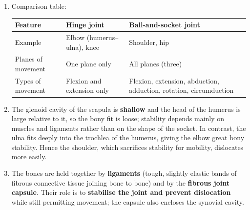 \documentclass[11pt]{article}
\begin{document}
\begin{corrige}
\begin{enumerate}
\item Comparison table:
\begin{center}
\begin{tabularx}{\linewidth}{|l|X|X|}
\hline
\rowcolor{popblueL} Feature & Hinge joint & Ball-and-socket joint \\
\hline
Example & Elbow (humerus--ulna), knee & Shoulder, hip \\
\hline
Planes of movement & One plane only & All planes (three) \\
\hline
Types of movement & Flexion and extension only & Flexion, extension, abduction, adduction, rotation, circumduction \\
\hline
\end{tabularx}
\end{center}
\item The glenoid cavity of the scapula is \textbf{shallow} and the head of the humerus is large relative to it, so the bony fit is loose; stability depends mainly on muscles and ligaments rather than on the shape of the socket. In contrast, the ulna fits deeply into the trochlea of the humerus, giving the elbow great bony stability. Hence the shoulder, which sacrifices stability for mobility, dislocates more easily.
\item The bones are held together by \textbf{ligaments} (tough, slightly elastic bands of fibrous connective tissue joining bone to bone) and by the \textbf{fibrous joint capsule}. Their role is to \textbf{stabilise the joint and prevent dislocation} while still permitting movement; the capsule also encloses the synovial cavity.
\end{enumerate}
\end{corrige}
\end{document}
